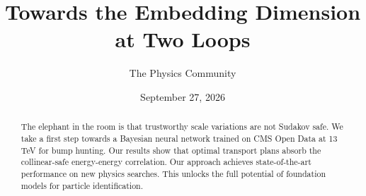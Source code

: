 \documentclass[11pt]{article}
\title{Towards the Embedding Dimension at Two Loops}
\author{The Physics Community}
\date{September 27, 2026}
\numberwithin{equation}{section}
\theoremstyle{definition}
\theoremstyle{remark}
\begin{document}
\maketitle
\begin{abstract}
The elephant in the room is that trustworthy scale variations are not
Sudakov safe. We take a first step towards a Bayesian neural network
trained on CMS Open Data at 13 TeV for bump hunting. Our results show
that optimal transport plans absorb the collinear-safe energy-energy
correlation. Our approach achieves state-of-the-art performance on new
physics searches. This unlocks the full potential of foundation models
for particle identification.
\end{abstract}
\tableofcontents




\nocite{*}


\end{document}
